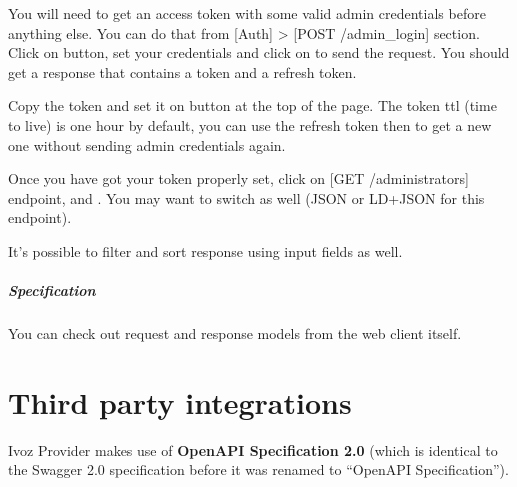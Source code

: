 \documentclass[letterpaper,10pt,english]{sphinxmanual}
\begin{document}

You will need to get an access token with some valid admin credentials before anything else. You can do that from {[}Auth{]} \textgreater{} {[}POST /admin\_login{]} section. Click on  button, set your credentials and click on  to send the request. You should get a response that contains a token and a refresh token.


Copy the token and set it on  button at the top of the page. The token ttl (time to live) is one hour by default, you can use the refresh token then to get a new one without sending admin credentials again.

Once you have got your token properly set, click on {[}GET /administrators{]} endpoint,  and . You may want to switch  as well (JSON or LD+JSON for this endpoint).


It's possible to filter and sort response using  input fields as well.
\paragraph{Specification}

You can check out request and response models from the web client itself.



\chapter{Third party integrations}
\label{api_rest/integrations:third-party-integrations}\label{api_rest/integrations::doc}
Ivoz Provider makes use of \textbf{OpenAPI Specification 2.0} (which is identical to the Swagger 2.0 specification before it was
renamed to ``OpenAPI Specification'').
\end{document}
